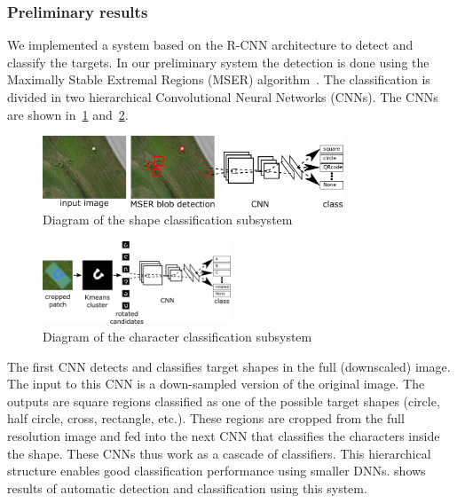 \documentclass{article} %
\begin{document}
\subsubsection{Preliminary results}
We implemented a system based on the R-CNN architecture to detect and classify
the targets. In our preliminary system the detection is done using the Maximally
Stable Extremal Regions (MSER) algorithm~\cite{Forssen2007}. The classification
is divided in two hierarchical Convolutional Neural Networks (CNNs). The CNNs are shown
in~\cref{fig:shape_diagram} and~\cref{fig:letter_diagram}.

\begin{figure}[h]
	\centering
	\includegraphics[width=0.8\textwidth]{diagram}
	\caption{Diagram of the shape classification subsystem}
	\label{fig:shape_diagram}
\end{figure}
\begin{figure}[h]
	\centering
	\includegraphics[width=0.5\textwidth]{letter_diagram}
	\caption{Diagram of the character classification subsystem}
	\label{fig:letter_diagram}
\end{figure}

The first CNN detects and classifies target shapes in the full (downscaled)
image. The input to this CNN is a down-sampled version of the original
image. The outputs are square regions classified as one of the possible target
shapes (circle, half circle, cross, rectangle, etc.). These regions are cropped
from the full resolution image and fed into the next CNN that classifies
the characters inside the shape. These CNNs thus work as a cascade of
classifiers. This hierarchical structure enables good classification
performance using smaller DNNs.  shows
results of automatic detection and classification using this system.
\end{document}
